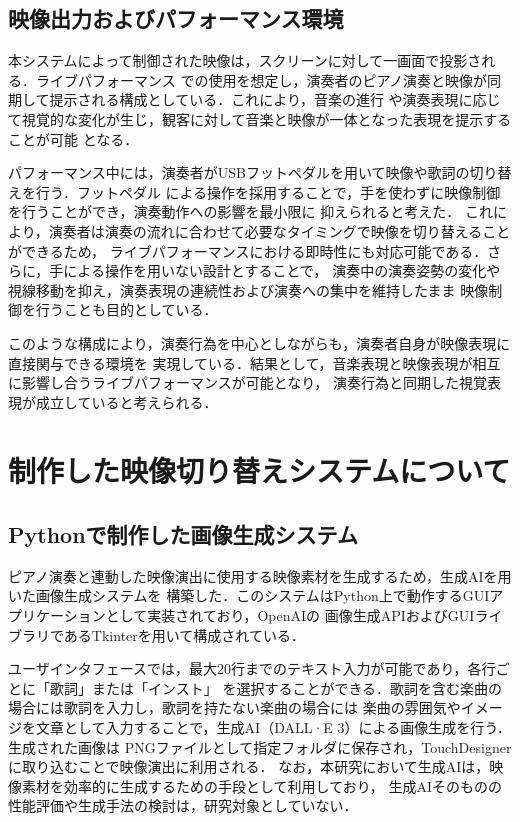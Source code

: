\subsection{映像出力およびパフォーマンス環境}

本システムによって制御された映像は，スクリーンに対して一画面で投影される．ライブパフォーマンス
での使用を想定し，演奏者のピアノ演奏と映像が同期して提示される構成としている．これにより，音楽の進行
や演奏表現に応じて視覚的な変化が生じ，観客に対して音楽と映像が一体となった表現を提示することが可能
となる．

パフォーマンス中には，演奏者がUSBフットペダルを用いて映像や歌詞の切り替えを行う．フットペダル
による操作を採用することで，手を使わずに映像制御を行うことができ，演奏動作への影響を最小限に
抑えられると考えた．
これにより，演奏者は演奏の流れに合わせて必要なタイミングで映像を切り替えることができるため，
ライブパフォーマンスにおける即時性にも対応可能である．さらに，手による操作を用いない設計とすることで，
演奏中の演奏姿勢の変化や視線移動を抑え，演奏表現の連続性および演奏への集中を維持したまま
映像制御を行うことも目的としている．

このような構成により，演奏行為を中心としながらも，演奏者自身が映像表現に直接関与できる環境を
実現している．結果として，音楽表現と映像表現が相互に影響し合うライブパフォーマンスが可能となり，
演奏行為と同期した視覚表現が成立していると考えられる．

\section{制作した映像切り替えシステムについて}

\subsection{Pythonで制作した画像生成システム}
ピアノ演奏と連動した映像演出に使用する映像素材を生成するため，生成AIを用いた画像生成システムを
構築した．このシステムはPython上で動作するGUIアプリケーションとして実装されており，OpenAIの
画像生成APIおよびGUIライブラリであるTkinterを用いて構成されている．

ユーザインタフェースでは，最大20行までのテキスト入力が可能であり，各行ごとに「歌詞」または「インスト」
を選択することができる．歌詞を含む楽曲の場合には歌詞を入力し，歌詞を持たない楽曲の場合には
楽曲の雰囲気やイメージを文章として入力することで，生成AI（DALL·E 3\cite{DALLE}）による画像生成を行う．生成された画像は
PNGファイルとして指定フォルダに保存され，TouchDesignerに取り込むことで映像演出に利用される．
なお，本研究において生成AIは，映像素材を効率的に生成するための手段として利用しており，
生成AIそのものの性能評価や生成手法の検討は，研究対象としていない．


